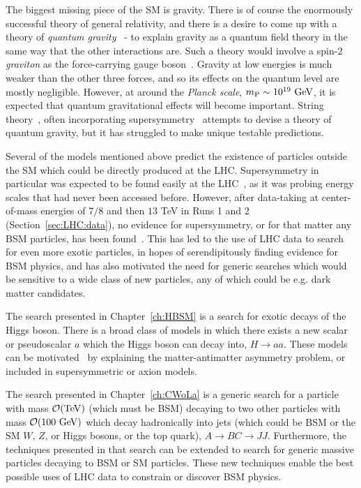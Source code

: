 The biggest missing piece of the SM is gravity.
There is of course the enormously successful theory of general relativity, and there is a desire to come up with a theory of \textit{quantum gravity}~\cite{Rovelli:2000aw,Ashtekar_1974,Ashtekar:2014kba} - to explain gravity as a quantum field theory in the same way that the other interactions are.
Such a theory would involve a spin-$2$ \textit{graviton} as the force-carrying gauge boson~\cite{PhysRev.98.1118}.
Gravity at low energies is much weaker than the other three forces, and so its effects on the quantum level are mostly negligible.
However, at around the \textit{Planck scale}, $m_\text{P}\sim 10^{19}~\mathrm{GeV}$, it is expected that quantum gravitational effects will become important.
String theory~\cite{Mukhi:2011zz}, often incorporating supersymmetry~\cite{wess_bagger_2009,Schwarz:1998ny} attempts to devise a theory of quantum gravity, but it has struggled to make unique testable predictions.


Several of the models mentioned above predict the existence of particles outside the SM which could be directly produced at the LHC.
Supersymmetry in particular was expected to be found easily at the LHC~\cite{Ellis:2008di}, as it was probing energy scales that had never been accessed before.
However, after data-taking at center-of-mass energies of $7/8$ and then $13$ TeV in Runs 1 and 2 (Section~\ref{sec:LHC:data}), no evidence for supersymmetry, or for that matter any BSM particles, has been found~\cite{Baer:2020kwz}.
This has led to the use of LHC data to search for even more exotic particles, in hopes of serendipitously finding evidence for BSM physics, and has also motivated the need for generic searches which would be sensitive to a wide class of new particles, any of which could be e.g. dark matter candidates.

The search presented in Chapter~\ref{ch:HBSM} is a search for exotic decays of the Higgs boson.
There is a broad class of models in which there exists a new scalar or pseudoscalar $a$ which the Higgs boson can decay into, $H\rightarrow aa$.
These models can be motivated~\cite{Curtin:2013fra} by explaining the matter-antimatter asymmetry problem, or included in supersymmetric or axion models.

The search presented in Chapter~\ref{ch:CWoLa} is a generic search for a particle with mass $\mathcal{O}(\mathrm{TeV})$ (which must be BSM) decaying to two other particles with mass $\mathcal{O}(100~\mathrm{GeV})$ which decay hadronically into jets (which could be BSM or the SM $W$, $Z$, or Higgs bosons, or the top quark), $A\rightarrow BC \rightarrow JJ$.
Furthermore, the techniques presented in that search can be extended to search for generic massive particles decaying to BSM or SM particles.
These new techniques enable the best possible uses of LHC data to constrain or discover BSM physics.
